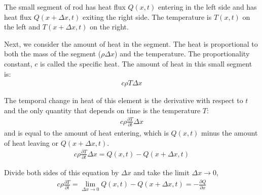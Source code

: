 The small segment of rod has heat flux $Q(x,t)$ entering in the left side and has heat flux $Q(x+\Delta x,t)$ exiting the right side. The temperature is $T(x,t)$ on the left and $T(x+\Delta x,t)$ on the right.

\begin{center}
\end{center}

Next, we consider the amount of heat in the segment.  The heat is proportional to both the mass of the segment ($\rho \Delta x$) and the temperature.  The proportionality constant, $c$ is called the specific heat.  The amount of heat in this small segment is:
%
\begin{align*}
c \rho T \Delta x
\end{align*}

The temporal change in heat of this element is the derivative with respect to $t$ and the only quantity that depends on time is the temperature $T$:
%
\begin{align*}
c \rho \frac{\partial T}{\partial t} \Delta x
\end{align*}
and is equal to the amount of heat entering, which is $Q(x,t)$ minus the amount of heat leaving or $Q(x+\Delta x,t)$.
%
\begin{align*}
c \rho \frac{\partial T}{\partial t} \Delta x   = Q(x,t) - Q(x+\Delta x,t)
\end{align*}

Divide both sides of this equation by $\Delta x$ and take the limit $\Delta x \rightarrow 0$,
%
\begin{align}
c \rho \frac{\partial T}{\partial t}    = \lim_{\Delta x \rightarrow 0} Q(x,t) - Q(x+\Delta x,t)
 =   -\frac{\partial Q}{\partial x} \label{eq:heat:eqn:deriv}
\end{align}

